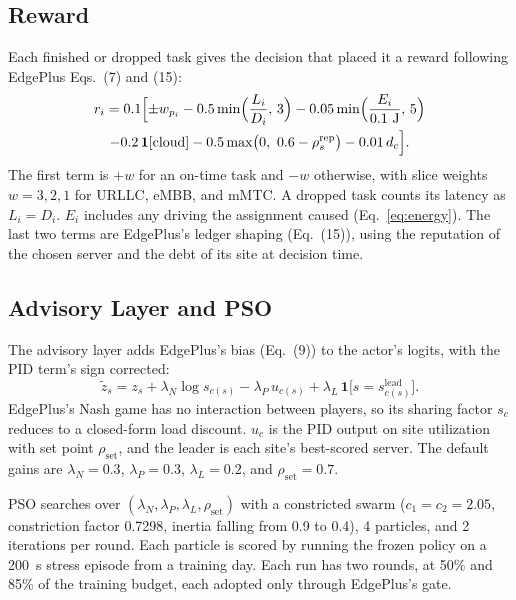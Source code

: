\documentclass[11pt,journal,onecolumn]{IEEEtran}
\begin{document}
\subsection{Reward}
Each finished or dropped task gives the decision that placed it a reward following EdgePlus Eqs.~(7) and (15):
\begin{multline}
r_i = 0.1\Bigl[\pm w_{p_i} - 0.5\min\Bigl(\frac{L_i}{D_i},\, 3\Bigr) - 0.05\min\Bigl(\frac{E_i}{0.1~\mathrm{J}},\, 5\Bigr) \\
- 0.2\,\mathbf{1}[\text{cloud}] - 0.5\max\bigl(0,\ 0.6 - \rho^{\mathrm{rep}}_s\bigr) - 0.01\, d_{c}\Bigr].
\label{eq:reward}
\end{multline}
The first term is $+w$ for an on-time task and $-w$ otherwise, with slice weights $w = 3, 2, 1$ for URLLC, eMBB, and mMTC. A dropped task counts its latency as $L_i = D_i$. $E_i$ includes any driving the assignment caused (Eq.~\eqref{eq:energy}). The last two terms are EdgePlus's ledger shaping (Eq.~(15)), using the reputation of the chosen server and the debt of its site at decision time.

\subsection{Advisory Layer and PSO}
The advisory layer adds EdgePlus's bias (Eq.~(9)) to the actor's logits, with the PID term's sign corrected:
\begin{equation}
\tilde z_s = z_s + \lambda_N \log s_{c(s)} - \lambda_P\, u_{c(s)} + \lambda_L\, \mathbf{1}\bigl[s = s^{\mathrm{lead}}_{c(s)}\bigr].
\label{eq:advisory}
\end{equation}
EdgePlus's Nash game has no interaction between players, so its sharing factor $s_c$ reduces to a closed-form load discount. $u_c$ is the PID output on site utilization with set point $\rho_{\mathrm{set}}$, and the leader is each site's best-scored server. The default gains are $\lambda_N = 0.3$, $\lambda_P = 0.3$, $\lambda_L = 0.2$, and $\rho_{\mathrm{set}} = 0.7$.

PSO searches over $(\lambda_N, \lambda_P, \lambda_L, \rho_{\mathrm{set}})$ with a constricted swarm ($c_1 = c_2 = 2.05$, constriction factor 0.7298, inertia falling from 0.9 to 0.4), 4 particles, and 2 iterations per round. Each particle is scored by running the frozen policy on a 200~s stress episode from a training day. Each run has two rounds, at 50\% and 85\% of the training budget, each adopted only through EdgePlus's gate.
\end{document}
